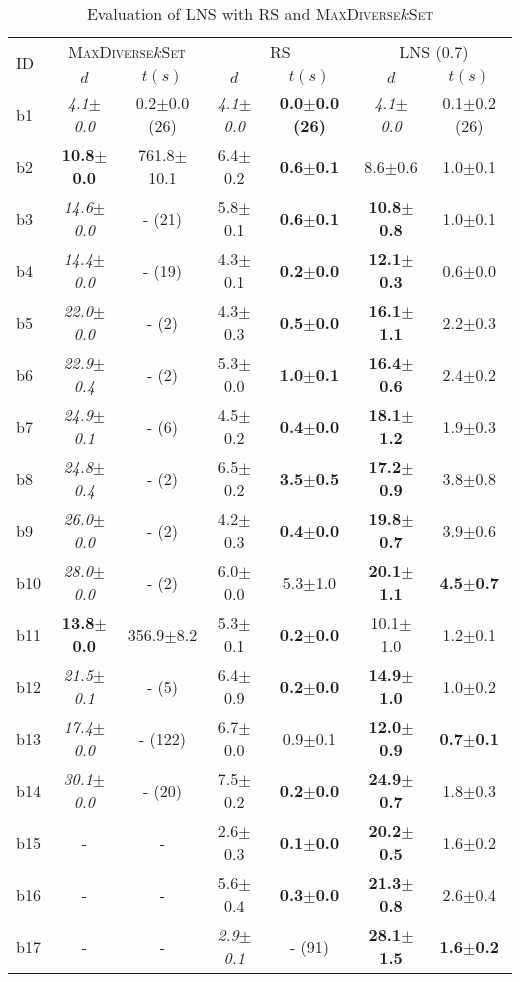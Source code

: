 \begin{longtable}{|l|c|c|c|c|c|c|}
\caption{\label{tab:dist_max_rs_lns} Evaluation of \ac{LNS} with \ac{RS} and \textsc{MaxDiverse$k$Set}}\\
\hline
\multirow{2}{*}{ID}&\multicolumn{2}{c|}{\textsc{MaxDiverse$k$Set}}&\multicolumn{2}{c|}{{RS}}&\multicolumn{2}{c|}{LNS (0.7)}\\
\cline{2-7}
&$d$&$t(s)$&$d$&$t(s)$&$d$&$t(s)$\\
\hline
b1&\textit{4.1$\pm$0.0} & 0.2$\pm$0.0 (26)&\textit{4.1$\pm$0.0} & \textbf{0.0$\pm$0.0 (26)}&\textit{4.1$\pm$0.0} & 0.1$\pm$0.2 (26)
\\
b2&\textbf{10.8$\pm$0.0} & 761.8$\pm$10.1&6.4$\pm$0.2 & \textbf{0.6$\pm$0.1}&8.6$\pm$0.6 & 1.0$\pm$0.1
\\
b3&\textit{14.6$\pm$0.0} & - (21)&5.8$\pm$0.1 & \textbf{0.6$\pm$0.1}&\textbf{10.8$\pm$0.8} & 1.0$\pm$0.1
\\
b4&\textit{14.4$\pm$0.0} & - (19)&4.3$\pm$0.1 & \textbf{0.2$\pm$0.0}&\textbf{12.1$\pm$0.3} & 0.6$\pm$0.0
\\
b5&\textit{22.0$\pm$0.0} & - (2)&4.3$\pm$0.3 & \textbf{0.5$\pm$0.0}&\textbf{16.1$\pm$1.1} & 2.2$\pm$0.3
\\
b6&\textit{22.9$\pm$0.4} & - (2)&5.3$\pm$0.0 & \textbf{1.0$\pm$0.1}&\textbf{16.4$\pm$0.6} & 2.4$\pm$0.2
\\
b7&\textit{24.9$\pm$0.1} & - (6)&4.5$\pm$0.2 & \textbf{0.4$\pm$0.0}&\textbf{18.1$\pm$1.2} & 1.9$\pm$0.3
\\
b8&\textit{24.8$\pm$0.4} & - (2)&6.5$\pm$0.2 & \textbf{3.5$\pm$0.5}&\textbf{17.2$\pm$0.9} & 3.8$\pm$0.8
\\
b9&\textit{26.0$\pm$0.0} & - (2)&4.2$\pm$0.3 & \textbf{0.4$\pm$0.0}&\textbf{19.8$\pm$0.7} & 3.9$\pm$0.6
\\
b10&\textit{28.0$\pm$0.0} & - (2)&6.0$\pm$0.0 & 5.3$\pm$1.0&\textbf{20.1$\pm$1.1} & \textbf{4.5$\pm$0.7}
\\
b11&\textbf{13.8$\pm$0.0} & 356.9$\pm$8.2&5.3$\pm$0.1 & \textbf{0.2$\pm$0.0}&10.1$\pm$1.0 & 1.2$\pm$0.1
\\
b12&\textit{21.5$\pm$0.1} & - (5)&6.4$\pm$0.9 & \textbf{0.2$\pm$0.0}&\textbf{14.9$\pm$1.0} & 1.0$\pm$0.2
\\
b13&\textit{17.4$\pm$0.0} & - (122)&6.7$\pm$0.0 & 0.9$\pm$0.1&\textbf{12.0$\pm$0.9} & \textbf{0.7$\pm$0.1}
\\
b14&\textit{30.1$\pm$0.0} & - (20)&7.5$\pm$0.2 & \textbf{0.2$\pm$0.0}&\textbf{24.9$\pm$0.7} & 1.8$\pm$0.3
\\
b15&- & -&2.6$\pm$0.3 & \textbf{0.1$\pm$0.0}&\textbf{20.2$\pm$0.5} & 1.6$\pm$0.2
\\
b16&- & -&5.6$\pm$0.4 & \textbf{0.3$\pm$0.0}&\textbf{21.3$\pm$0.8} & 2.6$\pm$0.4
\\
b17&- & -&\textit{2.9$\pm$0.1} & - (91)&\textbf{28.1$\pm$1.5} & \textbf{1.6$\pm$0.2}
\\
\hline
\end{longtable}
